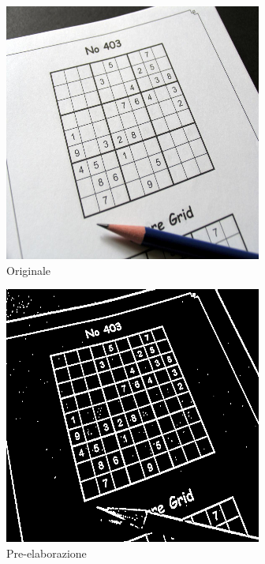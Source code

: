 \documentclass[a4paper, 10pt]{article}
\begin{document}
\begin{figure}[ht]
    \def\subwidth{0.40}
    \def\imgwidth{0.70}
    \centering
    \begin{subfigure}[b]{\subwidth\linewidth}
        \centering
        \includegraphics[width=\imgwidth\linewidth]{imgs/input.png}
        \caption{Originale}\label{subfig:input}
        \vspace{4ex}
    \end{subfigure}%
    \begin{subfigure}[b]{\subwidth\linewidth}
        \centering
        \includegraphics[width=\imgwidth\linewidth]{imgs/process_out.png}
        \caption{Pre-elaborazione}\label{subfig:preprocess}
        \vspace{4ex}
    \end{subfigure}
    \begin{subfigure}[b]{\subwidth\linewidth}
        \centering

\end{subfigure}
\end{figure}
\end{document}
